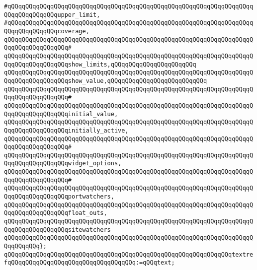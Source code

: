 \verb|#qQQqqQQqqQQqqQQqqQQqqQQqqQQqqQQqqQQqqQQqqQQqqQQqqQQqqQQqqQQqqQQqqQQqqQQqqQQqqQQqqQQqupper_limit,|\newline
\verb|#qQQqqQQqqQQqqQQqqQQqqQQqqQQqqQQqqQQqqQQqqQQqqQQqqQQqqQQqqQQqqQQqqQQqqQQqqQQqqQQqqQQqcoverage,|\newline
\verb|qQQqqQQqqQQqqQQqqQQqqQQqqQQqqQQqqQQqqQQqqQQqqQQqqQQqqQQqqQQqqQQqqQQqqQQqqQQqqQQqqQQqqQQq#|\newline
\verb|qQQqqQQqqQQqqQQqqQQqqQQqqQQqqQQqqQQqqQQqqQQqqQQqqQQqqQQqqQQqqQQqqQQqqQQqqQQqqQQqqQQqqQQqshow_limits,qQQqqQQqqQQqqQQqqQQqqQQq|\newline
\verb|qQQqqQQqqQQqqQQqqQQqqQQqqQQqqQQqqQQqqQQqqQQqqQQqqQQqqQQqqQQqqQQqqQQqqQQqqQQqqQQqqQQqqQQqshow_value,qQQqqQQqqQQqqQQqqQQqqQQqqQQq|\newline
\verb|qQQqqQQqqQQqqQQqqQQqqQQqqQQqqQQqqQQqqQQqqQQqqQQqqQQqqQQqqQQqqQQqqQQqqQQqqQQqqQQqqQQqqQQq#|\newline
\verb|qQQqqQQqqQQqqQQqqQQqqQQqqQQqqQQqqQQqqQQqqQQqqQQqqQQqqQQqqQQqqQQqqQQqqQQqqQQqqQQqqQQqqQQqinitial_value,|\newline
\verb|qQQqqQQqqQQqqQQqqQQqqQQqqQQqqQQqqQQqqQQqqQQqqQQqqQQqqQQqqQQqqQQqqQQqqQQqqQQqqQQqqQQqqQQqinitially_active,|\newline
\verb|qQQqqQQqqQQqqQQqqQQqqQQqqQQqqQQqqQQqqQQqqQQqqQQqqQQqqQQqqQQqqQQqqQQqqQQqqQQqqQQqqQQqqQQq#|\newline
\verb|qQQqqQQqqQQqqQQqqQQqqQQqqQQqqQQqqQQqqQQqqQQqqQQqqQQqqQQqqQQqqQQqqQQqqQQqqQQqqQQqqQQqqQQqwidget_options,|\newline
\verb|qQQqqQQqqQQqqQQqqQQqqQQqqQQqqQQqqQQqqQQqqQQqqQQqqQQqqQQqqQQqqQQqqQQqqQQqqQQqqQQqqQQqqQQq#|\newline
\verb|qQQqqQQqqQQqqQQqqQQqqQQqqQQqqQQqqQQqqQQqqQQqqQQqqQQqqQQqqQQqqQQqqQQqqQQqqQQqqQQqqQQqqQQqportwatchers,|\newline
\verb|qQQqqQQqqQQqqQQqqQQqqQQqqQQqqQQqqQQqqQQqqQQqqQQqqQQqqQQqqQQqqQQqqQQqqQQqqQQqqQQqqQQqqQQqfloat_outs,|\newline
\verb|qQQqqQQqqQQqqQQqqQQqqQQqqQQqqQQqqQQqqQQqqQQqqQQqqQQqqQQqqQQqqQQqqQQqqQQqqQQqqQQqqQQqqQQqsitewatchers|\newline
\verb|qQQqqQQqqQQqqQQqqQQqqQQqqQQqqQQqqQQqqQQqqQQqqQQqqQQqqQQqqQQqqQQqqQQqqQQqqQQqqQQq};|\newline
\newline
\verb|qQQqqQQqqQQqqQQqqQQqqQQqqQQqqQQqqQQqqQQqqQQqqQQqqQQqqQQqqQQqqQQqtextrefqQQqqQQqqQQqqQQqqQQqqQQqqQQqqQQqqQQq:=qQQqtext;|\newline
\newline
